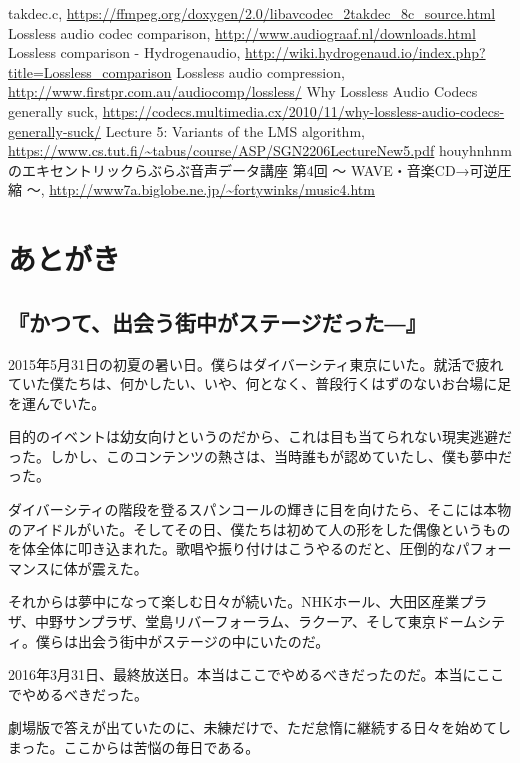 \documentclass[uplatex,dvipdfmx,b5j,10pt]{jsbook}
\theoremstyle{definition}
\begin{document}
\begin{thebibliography}{99}
 takdec.c, \url{https://ffmpeg.org/doxygen/2.0/libavcodec_2takdec_8c_source.html}
 Lossless audio codec comparison, \url{http://www.audiograaf.nl/downloads.html}
 Lossless comparison - Hydrogenaudio, \url{http://wiki.hydrogenaud.io/index.php?title=Lossless_comparison}
 Lossless audio compression, \url{http://www.firstpr.com.au/audiocomp/lossless/}
 Why Lossless Audio Codecs generally suck, \url{https://codecs.multimedia.cx/2010/11/why-lossless-audio-codecs-generally-suck/}
 Lecture 5: Variants of the LMS algorithm, \url{https://www.cs.tut.fi/~tabus/course/ASP/SGN2206LectureNew5.pdf}
 houyhnhnmのエキセントリックらぶらぶ音声データ講座 第4回 ～ WAVE・音楽CD→可逆圧縮 ～, \url{http://www7a.biglobe.ne.jp/~fortywinks/music4.htm}
\end{thebibliography}

\printindex

\chapter*{あとがき}

\section*{『かつて、出会う街中がステージだった―』 }

2015年5月31日の初夏の暑い日。僕らはダイバーシティ東京にいた。就活で疲れていた僕たちは、何かしたい、いや、何となく、普段行くはずのないお台場に足を運んでいた。

目的のイベントは幼女向けというのだから、これは目も当てられない現実逃避だった。しかし、このコンテンツの熱さは、当時誰もが認めていたし、僕も夢中だった。

ダイバーシティの階段を登るスパンコールの輝きに目を向けたら、そこには本物のアイドルがいた。そしてその日、僕たちは初めて人の形をした偶像というものを体全体に叩き込まれた。歌唱や振り付けはこうやるのだと、圧倒的なパフォーマンスに体が震えた。

それからは夢中になって楽しむ日々が続いた。NHKホール、大田区産業プラザ、中野サンプラザ、堂島リバーフォーラム、ラクーア、そして東京ドームシティ。僕らは出会う街中がステージの中にいたのだ。

2016年3月31日、最終放送日。本当はここでやめるべきだったのだ。本当にここでやめるべきだった。

劇場版で答えが出ていたのに、未練だけで、ただ怠惰に継続する日々を始めてしまった。ここからは苦悩の毎日である。
\end{document}
